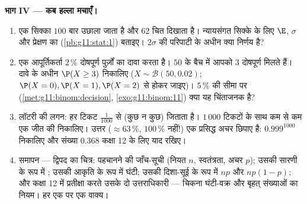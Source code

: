 \begin{problem}
\medskip
\noindent\textbf{भाग IV --- कब हल्ला मचाएँ।}
\begin{enumerate}[resume]
  \item एक सिक्का $100$ बार उछाला जाता है और $62$ चित दिखाता है। न्यायसंगत
        सिक्के के लिए $\E$, $\sigma$ और प्रेक्षण का  (\cref{pb:g11:stat:1}) बताइए। $2\sigma$
        की परिपाटी के अधीन क्या निर्णय है?
  \item एक आपूर्तिकर्ता $2\,\%$ दोषपूर्ण पुर्ज़ों का दावा करता है। $50$ के
        बैच में आपको $3$ दोषपूर्ण मिलते हैं। दावे के अधीन $\P(X \geq 3)$ निकालिए
        ($X \sim \mathcal B(50, 0.02)$; $\P(X = 0), \P(X = 1), \P(X = 2)$ से होकर जाइए)। $5\,\%$ की सीमा पर (\cref{met:g11:binom:decision}, \cref{exo:g11:binom:11}) क्या
        यह चिंताजनक है?
  \item लॉटरी की लगन: हर टिकट  $\frac{1}{1000}$ से (कुछ न कुछ) जिताता है।
        $1\,000$ टिकटों के साथ कम से कम एक जीत की  निकालिए। उत्तर
        ($\approx 63\,\%$, $100\,\%$ नहीं!) एक प्रसिद्ध अचर छिपाए है: $0.999^{1000}$ निकालिए और
        संख्या $0.368$ कक्षा 12 के लिए याद रखिए।
  \item समापन --- द्विपद का चित्र: पहचानने की जाँच-सूची (नियत $n$,
        स्वतंत्रता, अचर $p$); उसकी सारणी के रूप में ; उसकी
        आकृति के रूप में घंटी; उसकी दिशा-सूई के रूप में $np$ और $np(1-p)$; और
        कक्षा 12 में प्रतीक्षा करते उसके दो उत्तराधिकारी --- चिकना घंटी-वक्र
        और बृहत् संख्याओं का नियम। हर एक पर एक वाक्य।
\end{enumerate}
\end{problem}
